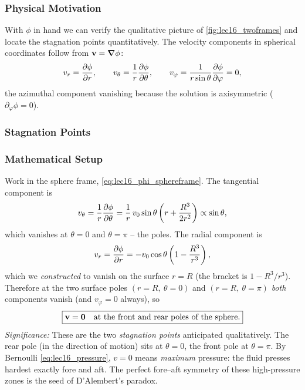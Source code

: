 \documentclass[../main.tex]{subfiles}
\begin{document}
\subsubsection*{Physical Motivation}
With $\phi$ in hand we can verify the qualitative picture of \cref{fig:lec16_twoframes} and locate the stagnation points quantitatively. The velocity components in spherical coordinates follow from $\mathbf{v}=\grad\phi$:
\begin{equation}
  v_r = \pdv{\phi}{r},\qquad v_\theta = \frac{1}{r}\pdv{\phi}{\theta},\qquad v_\varphi = \frac{1}{r\sin\theta}\pdv{\phi}{\varphi}=0,
  \label{eq:lec16_vel_components}
\end{equation}
the azimuthal component vanishing because the solution is axisymmetric ($\partial_\varphi\phi=0$).

\subsubsection{Stagnation Points}

\subsubsection*{Mathematical Setup}
Work in the sphere frame, \eqref{eq:lec16_phi_sphereframe}. The tangential component is
\begin{equation}
  v_\theta = \frac{1}{r}\pdv{\phi}{\theta} = \frac{1}{r}\,v_0\sin\theta\left(r+\frac{R^3}{2r^2}\right)\propto\sin\theta,
  \label{eq:lec16_vtheta}
\end{equation}
which vanishes at $\theta=0$ and $\theta=\pi$ -- the poles. The radial component is
\begin{equation}
  v_r = \pdv{\phi}{r} = -v_0\cos\theta\left(1-\frac{R^3}{r^3}\right),
  \label{eq:lec16_vr}
\end{equation}
which we \emph{constructed} to vanish on the surface $r=R$ (the bracket is $1-R^3/r^3$). Therefore at the two surface poles $(r=R,\ \theta=0)$ and $(r=R,\ \theta=\pi)$ \emph{both} components vanish (and $v_\varphi=0$ always), so
\begin{equation}
  \boxed{\mathbf{v} = \mathbf{0}\quad\text{at the front and rear poles of the sphere.}}
  \label{eq:lec16_stagnation}
\end{equation}
\textit{Significance:} These are the two \emph{stagnation points} anticipated qualitatively. The rear pole (in the direction of motion) sits at $\theta=0$, the front pole at $\theta=\pi$. By Bernoulli \eqref{eq:lec16_pressure}, $v=0$ means \emph{maximum} pressure: the fluid presses hardest exactly fore and aft. The perfect fore--aft symmetry of these high-pressure zones is the seed of D'Alembert's paradox.
\end{document}
